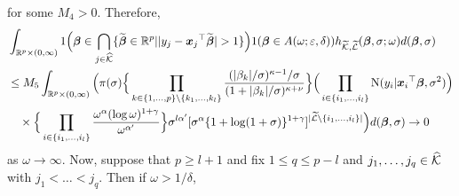 \documentclass[12pt]{article}
\def\ep{{\varepsilon}}
\def\si{{\sigma}}
\def\al{{\alpha}}
\def\be{{\beta}}
\def\ga{{\gamma}}
\def\de{{\delta}}
\def\ep{{\varepsilon}}
\def\si{{\sigma}}
\def\om{{\omega}}
\def\non{{\nonumber}}
\def\Lc{{\cal L}}
\def\Kc{{\cal K}}
\def\al{{\alpha}}
\def\be{{\beta}}
\def\ga{{\gamma}}
\def\de{{\delta}}
\def\ep{{\varepsilon}}
\def\si{{\sigma}}
\def\om{{\omega}}
\def\ka{{\kappa}}
\def\bbe{{\text{\boldmath $\beta$}}}
\def\bbet{{\widetilde \bbe}}
\def\x{{\text{\boldmath $x$}}}
\def\Lc{{\cal L}}
\def\Kc{{\cal K}}
\def\non{{\nonumber}}
\begin{document}
for some $M_4 > 0$. 
Therefore, 
\begin{align}
&\int_{\mathbb{R} ^p \times (0, \infty )} 1\Big( \bbe \in \bigcap_{j \in \widehat{\Kc }} \{ \bbet \in \mathbb{R} ^p | | y_j - {\x _j}^{\top } \bbet | > 1 \} \Big) 1( \bbe \in A( \om ; \ep , \de )) h_{\widetilde{\Kc } , \widetilde{\Lc }} ( \bbe , \si ; \om ) d( \bbe , \si ) \non \\
&\le M_5 \int_{\mathbb{R} ^p \times (0, \infty )} \Big( \pi ( \si ) \Big\{ \prod_{k \in \{ 1, \dots , p \} \setminus \{ k_1 , \dots , k_l \} } {(| \be _k | / \si )^{\ka - 1} / \si \over (1 + | \be _k | / \si )^{\ka + \nu }} \Big\} \Big( \prod_{i \in \{ i_1 , \dots , i_l \} } {\rm{N}} ( y_i | {\x _i}^{\top } \bbe , \si ^2 ) \Big) \non \\
&\quad \times \Big\{ \prod_{i \in \{ i_1 , \dots , i_l \} } {\om ^{\al } ( \log \om )^{1 + \ga } \over \om ^{{\al }'}} \Big\} \si ^{l {\al }'} [ \si ^{\al } \{ 1 + \log (1 + \si ) \} ^{1 + \ga } ]^{| \widetilde{\Lc } \setminus \{ i_1 , \dots , i_l \} |} \Big) d( \bbe , \si ) \to 0 \non 
\end{align}
as $\om \to \infty $. 
Now, suppose that $p \ge l + 1$ and fix $1 \le q \le p - l$ and $j_1 , \dots , j_q \in \widehat{\Kc }$ with $j_1 < \dots < j_q$. 
Then if $\om > 1 / \de $, 
%
\end{document}
